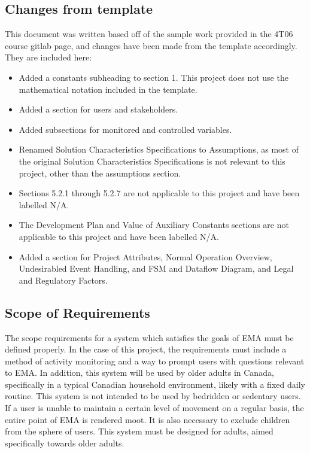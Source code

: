 \documentclass[12pt]{article}
\begin{document}
\subsection{Changes from template}
This document was written based off of the sample work provided in the 4T06 course gitlab page, and changes have been made from the template accordingly. They are included here:\\

\begin{itemize}
	\item Added a constants subheading to section 1. This project does not use the mathematical notation included in the template.
	\item Added a section for users and stakeholders.
	\item Added subsections for monitored and controlled variables.
	\item Renamed Solution Characteristics Specifications to Assumptions, as most of the original Solution Characteristics Specifications is not relevant to this project, other than the 					assumptions section.
	\item Sections 5.2.1 through 5.2.7 are not applicable to this project and have been labelled N/A.
	\item The Development Plan and Value of Auxiliary Constants sections are not applicable to this project and have been labelled N/A.
	\item Added a section for Project Attributes, Normal Operation Overview, Undesirabled Event Handling, and FSM and Dataflow Diagram, and Legal and Regulatory Factors.
\end{itemize}

\subsection{Scope of Requirements}

The scope requirements for a system which satisfies the goals of EMA must be defined properly. In the case of this project, the requirements must include a method of activity monitoring and a way to prompt users with questions relevant to EMA. In addition, this system will be used by older adults in Canada, specifically in a typical Canadian household environment, likely with a fixed daily routine. This system is not intended to be used by bedridden or sedentary users. If a user is unable to maintain a certain level of movement on a regular basis, the entire point of EMA is rendered moot. It is also necessary to exclude children from the sphere of users. This system must be designed for adults, aimed specifically towards older adults.\\
\end{document}
